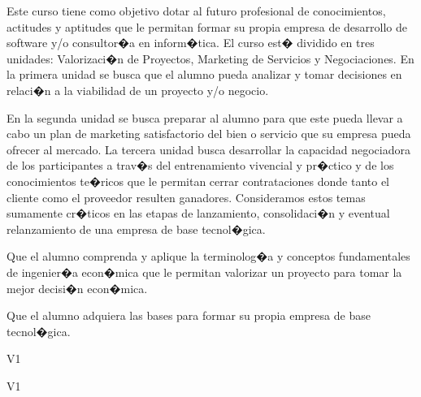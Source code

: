 \begin{syllabus}


\begin{justification}
Este curso tiene como objetivo dotar al futuro profesional de conocimientos, actitudes y aptitudes que le permitan formar su propia empresa de desarrollo de software y/o consultor�a en inform�tica. El curso est� dividido en tres unidades: Valorizaci�n de Proyectos, Marketing de Servicios y Negociaciones. En la primera unidad se busca que el alumno pueda analizar y tomar decisiones en relaci�n a la viabilidad de un proyecto y/o negocio.

En la segunda unidad se busca preparar al alumno para que este pueda llevar a cabo un plan de marketing satisfactorio del bien o servicio que su empresa pueda ofrecer al mercado. La tercera unidad busca desarrollar la capacidad negociadora de los participantes a trav�s del entrenamiento vivencial y pr�ctico y de los conocimientos te�ricos que le permitan cerrar contrataciones donde tanto el cliente como el proveedor resulten ganadores. Consideramos estos temas sumamente cr�ticos en las etapas de lanzamiento, consolidaci�n y eventual relanzamiento de una empresa de base tecnol�gica.
\end{justification}

\begin{goals}
\item Que el alumno comprenda y aplique la terminolog�a y conceptos fundamentales de ingenier�a econ�mica que le permitan valorizar un proyecto para tomar la mejor decisi�n econ�mica.
\item Que el alumno adquiera las bases para formar su propia empresa de base tecnol�gica.
\end{goals}

\begin{outcomes}{V1}
    \item {}
    \item {}
    \item {}
\end{outcomes}

\begin{competences}{V1}
    \item {} 
    \item {}
    \item {}
    \item {}
    \item {}
    \item {}
    \item {}
    \item {}
\end{competences}


\end{syllabus}
